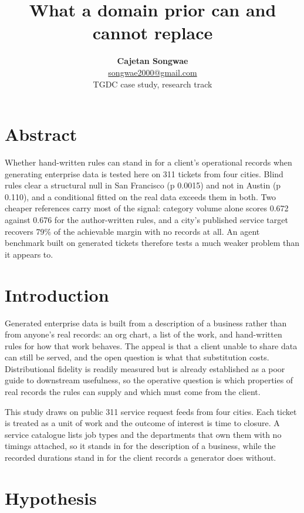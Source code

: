 \documentclass[10pt,a4paper,twocolumn]{article}
\title{\vspace{-1.0em}\textbf{What a domain prior can and cannot replace}\vspace{-0.4em}}
\author{\textbf{Cajetan Songwae} \\
  \small{\href{mailto:songwae2000@gmail.com}{songwae2000@gmail.com}} \\
  \small{TGDC case study, research track}}
\date{}
\begin{document}
\twocolumn[
  \begin{@twocolumnfalse}
  \maketitle
  \vspace{-2.2em}
  \end{@twocolumnfalse}
]

\section*{Abstract}

Whether hand-written rules can stand in for a client's operational records when
generating enterprise data is tested here on 311 tickets from four cities. Blind
rules clear a structural null in San Francisco (p 0.0015) and not in Austin (p
0.110), and a conditional fitted on the real data exceeds them in both. Two
cheaper references carry most of the signal: category volume alone scores 0.672
against 0.676 for the author-written rules, and a city's published service
target recovers 79\% of the achievable margin with no records at all. An agent
benchmark built on generated tickets therefore tests a much weaker problem than
it appears to.

\section*{Introduction}

Generated enterprise data is built from a description of a business rather than
from anyone's real records: an org chart, a list of the work, and hand-written
rules for how that work behaves. The appeal is that a client unable to share
data can still be served, and the open question is what that substitution costs.
Distributional fidelity is readily measured but is already established as a poor
guide to downstream usefulness, so the operative question is which properties of
real records the rules can supply and which must come from the client.

This study draws on public 311 service request feeds from four cities. Each
ticket is treated as a unit of work and the outcome of interest is time to
closure. A service catalogue lists job types and the departments that own them
with no timings attached, so it stands in for the description of a business,
while the recorded durations stand in for the client records a generator does
without.

\section*{Hypothesis}
\end{document}
